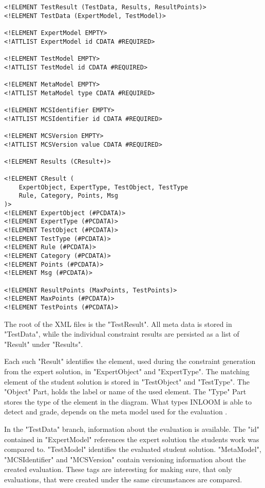\pagebreak
\lstset{language=XML}
\begin{lstlisting}[caption={
    XML format, currently used to persist the results the INLOOM software generates.
}, captionpos=b]
<!ELEMENT TestResult (TestData, Results, ResultPoints)>
<!ELEMENT TestData (ExpertModel, TestModel)>

<!ELEMENT ExpertModel EMPTY>
<!ATTLIST ExpertModel id CDATA #REQUIRED>

<!ELEMENT TestModel EMPTY>
<!ATTLIST TestModel id CDATA #REQUIRED>

<!ELEMENT MetaModel EMPTY>
<!ATTLIST MetaModel type CDATA #REQUIRED>

<!ELEMENT MCSIdentifier EMPTY>
<!ATTLIST MCSIdentifier id CDATA #REQUIRED>

<!ELEMENT MCSVersion EMPTY>
<!ATTLIST MCSVersion value CDATA #REQUIRED>

<!ELEMENT Results (CResult+)>

<!ELEMENT CResult (
    ExpertObject, ExpertType, TestObject, TestType
    Rule, Category, Points, Msg
)>
<!ELEMENT ExpertObject (#PCDATA)>
<!ELEMENT ExpertType (#PCDATA)> 
<!ELEMENT TestObject (#PCDATA)> 
<!ELEMENT TestType (#PCDATA)>  
<!ELEMENT Rule (#PCDATA)>  
<!ELEMENT Category (#PCDATA)>  
<!ELEMENT Points (#PCDATA)>  
<!ELEMENT Msg (#PCDATA)>  

<!ELEMENT ResultPoints (MaxPoints, TestPoints)>  
<!ELEMENT MaxPoints (#PCDATA)>  
<!ELEMENT TestPoints (#PCDATA)>  
\end{lstlisting}
\pagebreak

The root of the XML files is the "TestResult". All meta data is stored in "TestData", while
the individual constraint results are persisted as a list of "Result" under "Results".

Each such "Result" identifies the element, used during the constraint generation from the expert
solution, in "ExpertObject" and "ExpertType". The matching element of the student solution is
stored in "TestObject" and "TestType". The "Object" Part, holds the label or name of the used
element. The "Type" Part stores the type of the element in the diagram. What types INLOOM is able
to detect and grade, depends on the meta model used for the evaluation \cite{1}.

In the "TestData" branch, information about the evaluation is available. The "id" contained in 
"ExpertModel" references the expert solution the students work was compared to. "TestModel"
identifies the evaluated student solution. "MetaModel", "MCSIdentifier" and "MCSVersion"
contain versioning information about the created evaluation. These tags are interesting for 
making sure, that only evaluations, that were created under the same circumstances are compared.

